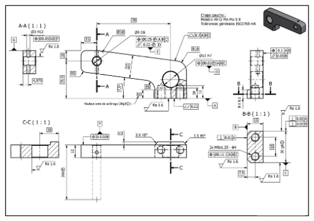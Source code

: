 \documentclass[10pt,fleqn]{article} %
\begin{document}
\begin{center}

{\includegraphics[width=\linewidth]{images/fig_06}}
\end{center}
\end{document}
